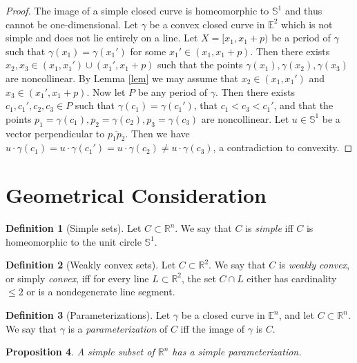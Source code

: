 \documentclass{amsart}
\newtheorem{proposition}{Proposition}[section]
\theoremstyle{definition}
\newtheorem{definition}[proposition]{Definition}
\theoremstyle{remark}
\begin{document}
\begin{proof}
    The image of a simple closed curve is homeomorphic to
    $\mathbb{S}^1$ and thus cannot be one-dimensional.
    Let $\gamma$ be a convex closed curve in $\mathbb{E}^2$
    which is not simple and does not lie entirely on a line.
    Let $X=[x_1,x_1+p)$ be a period of $\gamma$ such that
    $\gamma(x_1)=\gamma(x_1')$ for some $x_1'\in(x_1,x_1+p)$.
    Then there exists $x_2,x_3\in(x_1,x_1')\cup(x_1',x_1+p)$
    such that the points $\gamma(x_1),\gamma(x_2),\gamma(x_3)$ are
    noncollinear. By Lemma \ref{lem} we may assume that
    $x_2\in(x_1,x_1')$ and $x_3\in(x_1',x_1+p)$.
    Now let $P$ be any period of $\gamma$. Then there exists
    $c_1,c_1',c_2,c_3\in P$ such that $\gamma(c_1)=\gamma(c_1')$,
    that $c_1<c_3<c_1'$, and that the points
    $p_1=\gamma(c_1),p_2=\gamma(c_2),p_3=\gamma(c_3)$ are noncollinear.
    Let $u\in\mathbb{S}^1$ be a vector perpendicular to
    $\overline{p_1p_2}$. Then we have
    $u\cdot\gamma(c_1)=u\cdot\gamma(c_1')=u\cdot\gamma(c_2)
        \ne u\cdot\gamma(c_3)$, a contradiction to convexity.
\end{proof}

\section{Geometrical Consideration}

\begin{definition}[Simple sets]
    Let $C\subset\mathbb{R}^n$.
    We say that $C$ is \emph{simple}
    iff $C$ is homeomorphic to
    the unit circle $\mathbb{S}^1$.
\end{definition}

\begin{definition}[Weakly convex sets]
    Let $C\subset\mathbb{R}^2$. We say that $C$ is
    \emph{weakly convex}, or simply \emph{convex},
    iff for every line $L\subset\mathbb{R}^2$, the set $C\cap L$
    either has cardinality $\le2$ or is a nondegenerate line segment.
\end{definition}

\begin{definition}[Parameterizations]
    Let $\gamma$ be a closed curve in $\mathbb{E}^n$,
    and let $C\subset\mathbb{R}^n$.
    We say that $\gamma$ is
    a \emph{parameterization} of $C$ iff the image of $\gamma$
    is $C$.
\end{definition}

\begin{proposition}
    \label{pro:simple_par}
    A simple subset of $\mathbb{R}^n$ has
    a simple parameterization.
\end{proposition}
\end{document}
